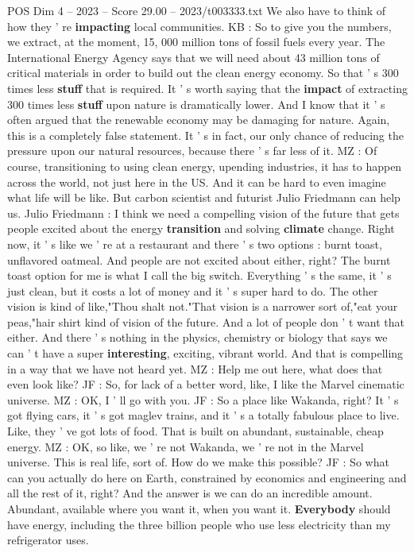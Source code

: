 \begin{textsample}{POS Dim 4 – 2023 – Score 29.00 – 2023/t003333.txt}
We also have to think of how they ' re \textbf{impacting} local communities.
KB : So to give you the numbers, we extract, at the moment, 15, 000 million tons of fossil fuels every year.
The International Energy Agency says that we will need about 43 million tons of critical materials in order to build out the clean energy economy.
So that ' s 300 times less \textbf{stuff} that is required.
It ' s worth saying that the \textbf{impact} of extracting 300 times less \textbf{stuff} upon nature is dramatically lower.
And I know that it ' s often argued that the renewable economy may be damaging for nature.
Again, this is a completely false statement.
It ' s in fact, our only chance of reducing the pressure upon our natural resources, because there ' s far less of it.
MZ : Of course, transitioning to using clean energy, upending industries, it has to happen across the world, not just here in the US.
And it can be hard to even imagine what life will be like.
But carbon scientist and futurist Julio Friedmann can help us.
Julio Friedmann : I think we need a compelling vision of the future that gets people excited about the energy \textbf{transition} and solving \textbf{climate} change.
Right now, it ' s like we ' re at a restaurant and there ' s two options : burnt toast, unflavored oatmeal.
And people are not excited about either, right?
The burnt toast option for me is what I call the big switch.
Everything ' s the same, it ' s just clean, but it costs a lot of money and it ' s super hard to do.
The other vision is kind of like,"Thou shalt not."That vision is a narrower sort of,"eat your peas,"hair shirt kind of vision of the future.
And a lot of people don ' t want that either.
And there ' s nothing in the physics, chemistry or biology that says we can ' t have a super \textbf{interesting}, exciting, vibrant world.
And that is compelling in a way that we have not heard yet.
MZ : Help me out here, what does that even look like?
JF : So, for lack of a better word, like, I like the Marvel cinematic universe.
MZ : OK, I ' ll go with you.
JF : So a place like Wakanda, right?
It ' s got flying cars, it ' s got maglev trains, and it ' s a totally fabulous place to live.
Like, they ' ve got lots of food.
That is built on abundant, sustainable, cheap energy.
MZ : OK, so like, we ' re not Wakanda, we ' re not in the Marvel universe.
This is real life, sort of.
How do we make this possible?
JF : So what can you actually do here on Earth, constrained by economics and engineering and all the rest of it, right?
And the answer is we can do an incredible amount.
Abundant, available where you want it, when you want it. \textbf{Everybody} should have energy, including the three billion people who use less electricity than my refrigerator uses.

\end{textsample}
